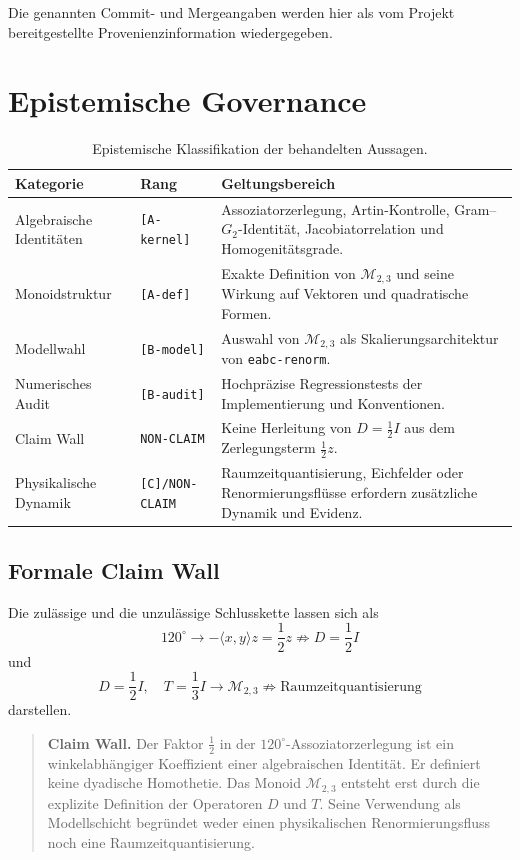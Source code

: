 \documentclass[11pt,a4paper]{article}
\theoremstyle{definition}
\newcommand{\MtwoThree}{\mathcal M_{2,3}}
\begin{document}
Die genannten Commit- und Mergeangaben werden hier als vom Projekt bereitgestellte Provenienzinformation wiedergegeben.

\section{Epistemische Governance}

\begin{table}[ht]
\centering
\small
\caption{Epistemische Klassifikation der behandelten Aussagen.}
\begin{tabularx}{\textwidth}{@{}p{}p{}X@{}}
\toprule
\textbf{Kategorie} & \textbf{Rang} & \textbf{Geltungsbereich}\\
\midrule
Algebraische Identitäten & \texttt{[A-kernel]} &
Assoziatorzerlegung, Artin-Kontrolle, Gram--$G_2$-Identität,
Jacobiatorrelation und Homogenitätsgrade.\\
Monoidstruktur & \texttt{[A-def]} &
Exakte Definition von $\MtwoThree$ und seine Wirkung auf Vektoren
und quadratische Formen.\\
Modellwahl & \texttt{[B-model]} &
Auswahl von $\MtwoThree$ als Skalierungsarchitektur von
\texttt{eabc-renorm}.\\
Numerisches Audit & \texttt{[B-audit]} &
Hochpräzise Regressionstests der Implementierung und Konventionen.\\
Claim Wall & \texttt{NON-CLAIM} &
Keine Herleitung von $D=\tfrac12I$ aus dem Zerlegungsterm
$\tfrac12z$.\\
Physikalische Dynamik & \texttt{[C]/NON-CLAIM} &
Raumzeitquantisierung, Eichfelder oder Renormierungsflüsse erfordern
zusätzliche Dynamik und Evidenz.\\
\bottomrule
\end{tabularx}
\end{table}

\subsection{Formale Claim Wall}

Die zulässige und die unzulässige Schlusskette lassen sich als
\[
120^\circ
\longrightarrow
-\langle x,y\rangle z=\frac12z
\not\Longrightarrow
D=\frac12I
\]
und
\[
D=\frac12I,\quad T=\frac13I
\longrightarrow
\MtwoThree
\not\Longrightarrow
\text{Raumzeitquantisierung}
\]
darstellen.

\begin{quote}
\textbf{Claim Wall.}
Der Faktor $\tfrac12$ in der $120^\circ$-Assoziatorzerlegung ist ein
winkelabhängiger Koeffizient einer algebraischen Identität. Er
definiert keine dyadische Homothetie. Das Monoid $\MtwoThree$ entsteht
erst durch die explizite Definition der Operatoren $D$ und $T$. Seine
Verwendung als Modellschicht begründet weder einen physikalischen
Renormierungsfluss noch eine Raumzeitquantisierung.
\end{quote}
\end{document}

